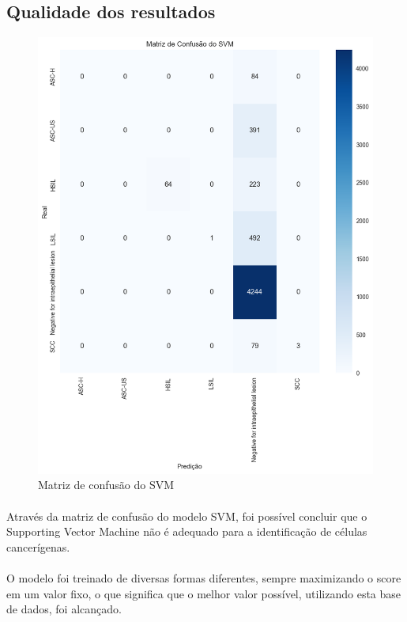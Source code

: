 \documentclass[12pt]{article}
\begin{document}
\subsection{Qualidade dos resultados}

\begin{figure}
    \centering
    \includegraphics{Matriz confusao SVM.png}
    \caption{Matriz de confusão do SVM}
    \label{fig:matriz-confusao-svm}
\end{figure}

\paragraph{}Através da matriz de confusão do modelo SVM, foi possível concluir que o Supporting Vector Machine não é adequado para a identificação de células cancerígenas.

\paragraph{}O modelo foi treinado de diversas formas diferentes, sempre maximizando o score em um valor fixo, o que significa que o melhor valor possível, utilizando esta base de dados, foi alcançado.
\end{document}
